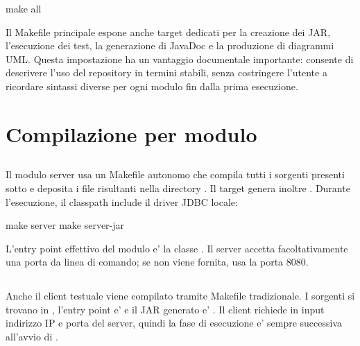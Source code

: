 \begin{commandblock}
  make all
\end{commandblock}

Il Makefile principale espone anche target dedicati per la creazione dei JAR,
l'esecuzione dei test, la generazione di JavaDoc e la produzione di diagrammi UML. Questa
impostazione ha un vantaggio documentale importante: consente di descrivere l'uso del
repository in termini stabili, senza costringere l'utente a ricordare sintassi diverse
per ogni modulo fin dalla prima esecuzione.

\section{Compilazione per modulo}

\subsection{}

Il modulo server usa un Makefile autonomo che compila tutti i sorgenti presenti sotto
 e deposita i file risultanti nella directory
. Il target  genera inoltre
. Durante l'esecuzione, il classpath include il driver JDBC locale:

\begin{commandblock}
  make server
  make server-jar
\end{commandblock}

L'entry point effettivo del modulo e' la classe . Il server
accetta facoltativamente una porta da linea di comando; se non viene fornita, usa la porta 8080.

\subsection{}

Anche il client testuale viene compilato tramite Makefile tradizionale. I sorgenti si
trovano in , l'entry point e'  e il JAR generato
e' . Il client richiede in input indirizzo IP e porta del
server, quindi la fase di esecuzione e' sempre successiva all'avvio di .

\subsection{}

